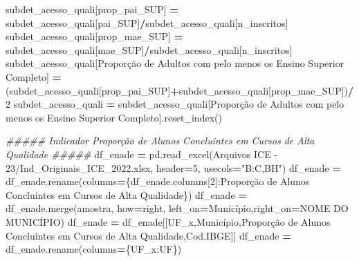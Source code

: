 \documentclass[
  12,
  dvipsnames]{article}
\newenvironment{Shaded}{\begin{snugshade}}{\end{snugshade}}
\newcommand{\CommentTok}[1]{\textcolor[rgb]{0.56,0.35,0.01}{\textit{#1}}}
\newcommand{\DecValTok}[1]{\textcolor[rgb]{0.00,0.00,0.81}{#1}}
\newcommand{\NormalTok}[1]{#1}
\newcommand{\OperatorTok}[1]{\textcolor[rgb]{0.81,0.36,0.00}{\textbf{#1}}}
\newcommand{\StringTok}[1]{\textcolor[rgb]{0.31,0.60,0.02}{#1}}
\begin{document}
\begin{Shaded}
\begin{Highlighting}[]
\NormalTok{subdet\_acesso\_quali[}\StringTok{\textquotesingle{}prop\_pai\_SUP\textquotesingle{}}\NormalTok{] }\OperatorTok{=}\NormalTok{ subdet\_acesso\_quali[}\StringTok{\textquotesingle{}pai\_SUP\textquotesingle{}}\NormalTok{]}\OperatorTok{/}\NormalTok{subdet\_acesso\_quali[}\StringTok{\textquotesingle{}n\_inscritos\textquotesingle{}}\NormalTok{]}
\NormalTok{subdet\_acesso\_quali[}\StringTok{\textquotesingle{}prop\_mae\_SUP\textquotesingle{}}\NormalTok{] }\OperatorTok{=}\NormalTok{ subdet\_acesso\_quali[}\StringTok{\textquotesingle{}mae\_SUP\textquotesingle{}}\NormalTok{]}\OperatorTok{/}\NormalTok{subdet\_acesso\_quali[}\StringTok{\textquotesingle{}n\_inscritos\textquotesingle{}}\NormalTok{]}
\NormalTok{subdet\_acesso\_quali[}\StringTok{\textquotesingle{}Proporção de Adultos com pelo menos os Ensino Superior Completo\textquotesingle{}}\NormalTok{] }\OperatorTok{=}\NormalTok{ (subdet\_acesso\_quali[}\StringTok{\textquotesingle{}prop\_pai\_SUP\textquotesingle{}}\NormalTok{]}\OperatorTok{+}\NormalTok{subdet\_acesso\_quali[}\StringTok{\textquotesingle{}prop\_mae\_SUP\textquotesingle{}}\NormalTok{])}\OperatorTok{/}\DecValTok{2}
\NormalTok{subdet\_acesso\_quali }\OperatorTok{=}\NormalTok{ subdet\_acesso\_quali[}\StringTok{\textquotesingle{}Proporção de Adultos com pelo menos os Ensino Superior Completo\textquotesingle{}}\NormalTok{].reset\_index()}

\CommentTok{\#\#\#\#\# Indicador Proporção de Alunos Concluintes em Cursos de Alta Qualidade \#\#\#\#\#}
\NormalTok{df\_enade }\OperatorTok{=}\NormalTok{ pd.read\_excel(}\StringTok{\textquotesingle{}Arquivos ICE {-} 23/Ind\_Originais\_ICE\_2022.xlsx\textquotesingle{}}\NormalTok{, header}\OperatorTok{=}\DecValTok{5}\NormalTok{,}
\NormalTok{                        usecols}\OperatorTok{=}\StringTok{"B:C,BH"}\NormalTok{)}
\NormalTok{df\_enade }\OperatorTok{=}\NormalTok{ df\_enade.rename(columns}\OperatorTok{=}\NormalTok{\{df\_enade.columns[}\DecValTok{2}\NormalTok{]:}\StringTok{\textquotesingle{}Proporção de Alunos Concluintes em Cursos de Alta Qualidade\textquotesingle{}}\NormalTok{\})}
\NormalTok{df\_enade }\OperatorTok{=}\NormalTok{ df\_enade.merge(amostra, how}\OperatorTok{=}\StringTok{\textquotesingle{}right\textquotesingle{}}\NormalTok{, left\_on}\OperatorTok{=}\StringTok{\textquotesingle{}Município\textquotesingle{}}\NormalTok{,right\_on}\OperatorTok{=}\StringTok{\textquotesingle{}NOME DO MUNICÍPIO\textquotesingle{}}\NormalTok{)}
\NormalTok{df\_enade }\OperatorTok{=}\NormalTok{ df\_enade[[}\StringTok{\textquotesingle{}UF\_x\textquotesingle{}}\NormalTok{,}\StringTok{\textquotesingle{}Município\textquotesingle{}}\NormalTok{,}\StringTok{\textquotesingle{}Proporção de Alunos Concluintes em Cursos de Alta Qualidade\textquotesingle{}}\NormalTok{,}\StringTok{\textquotesingle{}Cod.IBGE\textquotesingle{}}\NormalTok{]]}
\NormalTok{df\_enade }\OperatorTok{=}\NormalTok{ df\_enade.rename(columns}\OperatorTok{=}\NormalTok{\{}\StringTok{\textquotesingle{}UF\_x\textquotesingle{}}\NormalTok{:}\StringTok{\textquotesingle{}UF\textquotesingle{}}\NormalTok{\})}


\end{Highlighting}
\end{Shaded}
\end{document}
